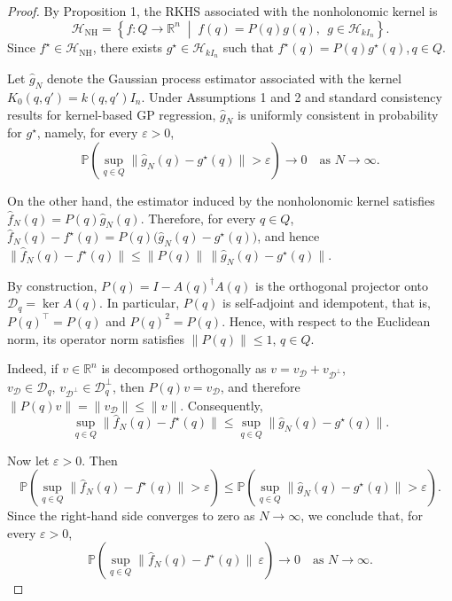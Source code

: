 \documentclass[10pt,a4paper]{amsart}
\begin{document}
\begin{proof}
By Proposition 1, the RKHS associated with the nonholonomic kernel is
\[
\mathcal H_{\mathrm{NH}}
=
\left\{
f:Q\to\mathbb R^n
\;\middle|\;
f(q)=P(q)g(q),\ \ g\in\mathcal H_{kI_n}
\right\}.
\]
Since $f^\star\in\mathcal H_{\mathrm{NH}}$, there exists $g^\star\in\mathcal H_{kI_n}$ such that $f^\star(q)=P(q)g^\star(q)$,\,$q\in Q$.


Let $\hat g_N$ denote the Gaussian process estimator associated with the kernel
$K_0(q,q')=k(q,q')I_n$. Under Assumptions 1 and 2 and standard consistency results for kernel-based GP regression, $\hat g_N$ is uniformly consistent in probability for $g^\star$, namely, for every $\varepsilon>0$,
\[
\mathbb{P}\!\left(
\sup_{q\in Q}\|\hat g_N(q)-g^\star(q)\|>\varepsilon
\right)\to 0
\quad\text{as }N\to\infty.
\]

On the other hand, the estimator induced by the nonholonomic kernel satisfies
$\hat f_N(q)=P(q)\hat g_N(q)$. Therefore, for every $q\in Q$, $\hat f_N(q)-f^\star(q)
=
P(q)\bigl(\hat g_N(q)-g^\star(q)\bigr)$,
and hence $\|\hat f_N(q)-f^\star(q)\|
\le
\|P(q)\|\,\|\hat g_N(q)-g^\star(q)\|$.


By construction, $P(q)=I-A(q)^\dagger A(q)$ is the orthogonal projector onto  $\mathcal D_q=\ker A(q)$. In particular, $P(q)$ is self-adjoint and idempotent, that is, $P(q)^\top=P(q)$ and $P(q)^2=P(q)$. Hence, with respect to the Euclidean norm, its operator norm satisfies $\|P(q)\|\le 1$, $q\in Q$. 

Indeed, if $v\in\mathbb R^n$ is decomposed orthogonally as $v=v_{\mathcal D}+v_{\mathcal D^\perp}$,
$v_{\mathcal D}\in\mathcal D_q,\, v_{\mathcal D^\perp}\in\mathcal D_q^\perp$,
then $P(q)v=v_{\mathcal D}$, and therefore
$\|P(q)v\|=\|v_{\mathcal D}\|\le \|v\|.$ Consequently,
\[
\sup_{q\in Q}\|\hat f_N(q)-f^\star(q)\|
\le
\sup_{q\in Q}\|\hat g_N(q)-g^\star(q)\|.
\]

Now let $\varepsilon>0$. Then
\[
\mathbb{P}\!\left(
\sup_{q\in Q}\|\hat f_N(q)\!-\!f^\star(q)\|\!>\!\varepsilon\!
\right)
\!\le\!
\mathbb{P}\!\left(
\sup_{q\in Q}\|\hat g_N(q)\!-\!g^\star(q)\|\!>\!\varepsilon\!
\right)\!.
\]
Since the right-hand side converges to zero as $N\to\infty$, we conclude that, for every $\varepsilon>0$,
\[
\mathbb{P}\!\left(
\sup_{q\in Q}\|\hat f_N(q)-f^\star(q)\|\>\varepsilon
\right)\to 0
\quad\text{as }N\to\infty.
\] \end{proof}
\end{document}

